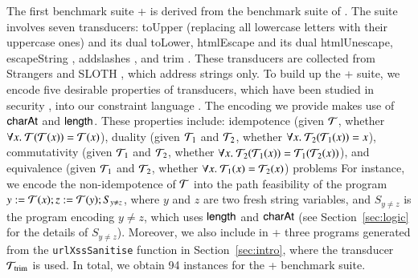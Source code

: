The first benchmark suite {\transducerbench+} is derived from the {\transducerbench} benchmark suite of {\ostrich} \cite{CHL+19}.  The {\transducerbench} suite involves seven transducers: toUpper (replacing all lowercase letters with their uppercase ones) and its dual toLower, htmlEscape \cite{htmlEscape} and its dual htmlUnescape, escapeString \cite{escapeString}, addslashes \cite{addslashes}, and trim \cite{trim}. These transducers are collected from Strangers \cite{YABI14} and SLOTH \cite{HJLRV18}, which address strings only. To build up the {\transducerbench+} suite, %
we encode five desirable properties of transducers, which have been studied in security \cite{BEK}, into our constraint language {\slint}. The encoding we provide makes use of $\mathsf{charAt}$ and $\mathsf{length}$. These properties include: idempotence (given $\mathcal{T}$, whether $\forall x.\ \mathcal{T}(\mathcal{T}(x)) = \mathcal{T}(x)$), duality (given $\mathcal{T}_1$ and $\mathcal{T}_2$, whether $\forall x.\ \mathcal{T}_2(\mathcal{T}_1(x)) = x$), commutativity (given $\mathcal{T}_1$ and $\mathcal{T}_2$, whether $\forall x.\ \mathcal{T}_2(\mathcal{T}_1(x)) = \mathcal{T}_1(\mathcal{T}_2(x))$), and equivalence (given $\mathcal{T}_1$ and $\mathcal{T}_2$, whether $\forall x.\ \mathcal{T}_1(x) = \mathcal{T}_2(x)$) problems
%
For instance, we encode the non-idempotence of $\mathcal{T}$ into the path feasibility of the {\slint} program $y:=\mathcal{T}(x); z:=\mathcal{T}(y); S_{y \neq z}$, where $y$ and $z$ are two fresh string variables, and $S_{y \neq z}$ is the {\slint} program encoding $y \neq z$, which uses $\mathsf{length}$ and $\mathsf{charAt}$ (see Section~\ref{sec:logic} for the details of $S_{y \neq z}$). Moreover, we also include in {\transducerbench+} three {\slint} programs generated from the {\tt urlXssSanitise} function in Section~\ref{sec:intro}, %
where the transducer $\mathcal{T}_{\rm trim}$ is used. In total, we obtain 94 instances for the {\transducerbench+} benchmark suite. 
%
